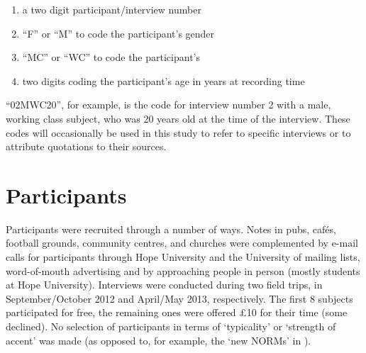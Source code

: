 \begin{enumerate}
	\item a two digit participant/interview number
	\item ``F'' or ``M'' to code the participant's gender
	\item ``MC'' or ``WC'' to code the participant's 
	\item two digits coding the participant's age in years at recording time
\end{enumerate}

``02MWC20'', for example, is the code for interview number 2 with a male, working class subject, who was 20 years old at the time of the interview.
These codes will occasionally be used in this study to refer to specific interviews or to attribute quotations to their sources.

	\section{Participants}\label{sec.prod_method.participants}
	
Participants were recruited through a number of ways. Notes in pubs, cafés, football grounds, community centres, and churches were complemented by e-mail calls for participants through Hope University and the University of  mailing lists, word-of-mouth advertising and by approaching people in person (mostly students at  Hope University). Interviews were conducted during two field trips, in September/October 2012 and April/May 2013, respectively. The first 8 subjects participated for free, the remaining ones were offered £10 for their time (some declined). No selection of participants in terms of `typicality' or `strength of accent' was made (as opposed to, for example, the `new NORMs' in \citealt{honeybone2001}).

